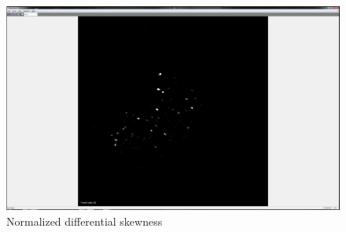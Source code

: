 \begin{figure}[htb]\centering
	\includegraphics[width=12cm]{figures/sw-sequence-bw.png}
	\caption{Normalized differential skewness}
\end{figure}



% 

\cleardoublepage{}
